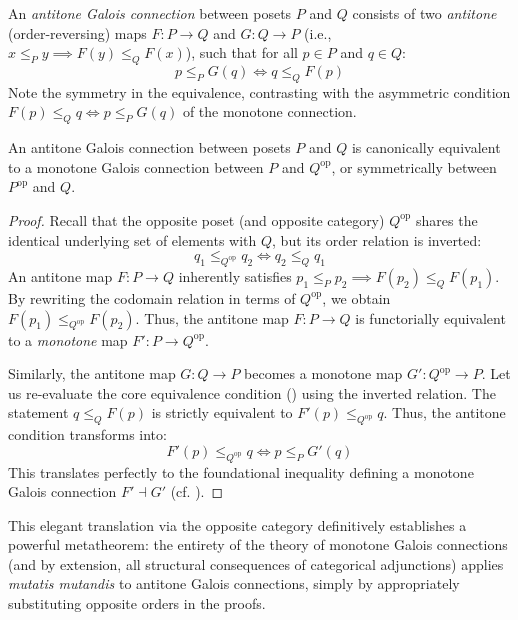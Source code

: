 \begin{definition}
An \emph{antitone Galois connection} between posets $P$ and $Q$ consists of two \emph{antitone} (order-reversing) maps $F: P \to Q$ and $G: Q \to P$ (i.e., $x \leq_P y \implies F(y) \leq_Q F(x)$), such that for all $p \in P$ and $q \in Q$:
\begin{equation}
\label{eq:antitone_galois}
    p \leq_P G(q) \iff q \leq_Q F(p)
\end{equation}
Note the symmetry in the equivalence, contrasting with the asymmetric condition $F(p) \leq_Q q \iff p \leq_P G(q)$ of the monotone connection.
\end{definition}

\begin{lemma}
An antitone Galois connection between posets $P$ and $Q$ is canonically equivalent to a monotone Galois connection between $P$ and $Q^{\text{op}}$, or symmetrically between $P^{\text{op}}$ and $Q$.
\end{lemma}
\begin{proof}
Recall that the opposite poset (and opposite category) $Q^{\text{op}}$ shares the identical underlying set of elements with $Q$, but its order relation is inverted: 
\[ q_1 \leq_{Q^{\text{op}}} q_2 \iff q_2 \leq_Q q_1 \]
An antitone map $F: P \to Q$ inherently satisfies $p_1 \leq_P p_2 \implies F(p_2) \leq_Q F(p_1)$. By rewriting the codomain relation in terms of $Q^{\text{op}}$, we obtain $F(p_1) \leq_{Q^{\text{op}}} F(p_2)$. Thus, the antitone map $F: P \to Q$ is functorially equivalent to a \emph{monotone} map $F': P \to Q^{\text{op}}$.

Similarly, the antitone map $G: Q \to P$ becomes a monotone map $G': Q^{\text{op}} \to P$. Let us re-evaluate the core equivalence condition () using the inverted relation. The statement $q \leq_Q F(p)$ is strictly equivalent to $F'(p) \leq_{Q^{\text{op}}} q$. Thus, the antitone condition transforms into:
\[ F'(p) \leq_{Q^{\text{op}}} q \iff p \leq_P G'(q) \]
This translates perfectly to the foundational inequality defining a monotone Galois connection $F' \dashv G'$ (cf. ).
\end{proof}

This elegant translation via the opposite category definitively establishes a powerful metatheorem: the entirety of the theory of monotone Galois connections (and by extension, all structural consequences of categorical adjunctions) applies \emph{mutatis mutandis} to antitone Galois connections, simply by appropriately substituting opposite orders in the proofs.


